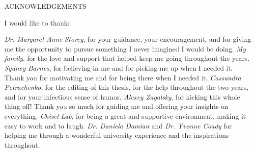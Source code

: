 \newpage
{}

\begin{center}
ACKNOWLEDGEMENTS
\end{center}

\noindent I would like to thank:
\begin{description}
\emph{Dr. Margaret-Anne Storey}, for your guidance, your encouragement, and for giving me the opportunity to pursue something I never imagined I would be doing.
\emph{My family}, for the love and support that helped keep me going throughout the years.
\emph{Sydney Barnes}, for believing in me and for picking me up when I needed it. Thank you for motivating me and for being there when I needed it.
\emph{Cassandra Petrachenko}, for the editing of this thesis, for the help throughout the two years, and for your infectious sense of humor.
\emph{Alexey Zagalsky}, for kicking this whole thing off! Thank you so much for guiding me and offering your insights on everything.
\emph{Chisel Lab}, for being a great and supportive environment, making it easy to work and to laugh.
\emph{Dr. Daniela Damian} and \emph{Dr. Yvonne Coady} for helping me through a wonderful university experience and the inspirations throughout.
\end{description}

